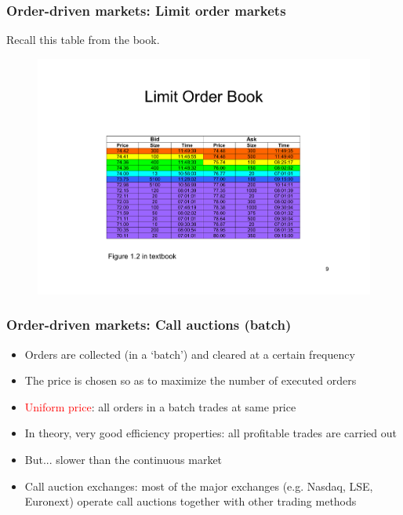 \documentclass[english,10pt]{beamer}
\theoremstyle{definition}
\begin{document}
\begin{frame}[label=main3]
\frametitle{Order-driven markets: Limit order markets}
Recall this table from the book.
\begin{figure}
	\includegraphics[width=.7\paperwidth]{pics/Image_LOB}
\end{figure}
\hyperlink{LOB}{}
\end{frame}


\begin{frame}
\frametitle{Order-driven markets: Call auctions (batch)}
\begin{itemize}
	\item Orders are collected (in a `batch') and cleared at a certain frequency
	\item The price is chosen so as to maximize the number of executed orders
	\item \textcolor{red}{Uniform price}: all orders in a batch trades at same price
	\item In theory,  very good efficiency properties: all profitable trades are carried out
	\item But... slower than the continuous market
	\item Call auction exchanges: most of the major exchanges (e.g. Nasdaq, LSE, Euronext) operate call auctions together with other trading methods
\end{itemize}
\end{frame}
\end{document}

